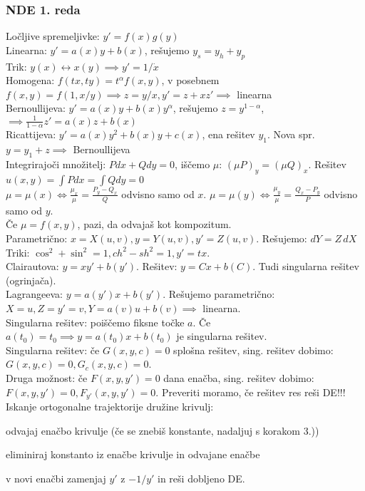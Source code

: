 \documentclass[a4paper,10pt]{article}
\title{\mytitle}
\author{Jure Slak}
\date{\today}
\theoremstyle{definition}
\newenvironment{enumerate*}%
{
\vspace{-6pt}
\begin{enumerate}
\setlength{\itemsep}{0pt}
\setlength{\parskip}{2pt}
}
{\end{enumerate}}
\let\oldint\int
\renewcommand{\int}{\oldint \!}
\begin{document}
\subsubsection*{NDE 1. reda}
Ločljive spremeljivke: $y' = f(x)g(y)$ \\
Linearna: $y' = a(x)y + b(x)$, rešujemo $y_s = y_h + y_p$ \\
Trik: $y(x) \leftrightarrow x(y) \implies y' = 1/\dot{x}$ \\
Homogena: $f(tx, ty) = t^\alpha f(x, y)$, v posebnem $f(x, y) = f(1, x/y)
  \implies z = y/x, y' = z + xz' \implies$ linearna \\
Bernoullijeva: $y' = a(x)y + b(x)y^\alpha$, rešujemo $z = y^{1-\alpha}$,
  $\implies \frac{1}{1-\alpha}z' = a(x)z + b(x)$ \\
Ricattijeva: $y' = a(x)y^2 + b(x)y + c(x)$, ena rešitev $y_1$. Nova spr. $y = y_1 + z
  \implies$ Bernoullijeva \\
Integrirajoči množitelj: $Pdx + Qdy = 0$, iščemo $\mu$: $(\mu P)_y = (\mu Q)_x$.
Rešitev $u(x, y) = \int Pdx = \int Qdy = 0$ \\
\hspace*{20pt} $\mu = \mu(x) \iff \frac{\mu_x}{\mu} = \frac{P_y - Q_x}{Q}$ odvisno samo od $x$.
               $\mu = \mu(y) \iff \frac{\mu_y}{\mu} = \frac{Q_x - P_y}{P}$ odvisno samo od $y$. \\
\hspace*{20pt} Če $\mu = f(x, y)$, pazi, da odvajaš kot kompozitum.\\
Parametrično: $x = X(u, v), y = Y(u, v), y' = Z(u, v)$. Rešujemo: $dY = Z \, dX$ \\
\hspace*{20pt} Triki: $\cos^2 + \sin^2 = 1, ch^2 - sh^2 = 1, y' = tx.$\\
Clairautova: $y = xy' + b(y')$. Rešitev: $y = C x + b(C)$. Tudi singularna
rešitev (ogrinjača). \\
Lagrangeeva: $y = a(y')x + b(y')$. Rešujemo parametrično: $X = u, Z = y' = v, Y =
a(v)u + b(v) \implies$ linearna. \\
\hspace*{20pt} Singularna rešitev: poiščemo fiksne točke $a$. Če $a(t_0) = t_0 \implies y = a(t_0) x + b(t_0)$ je singularna rešitev.\\
Singularna rešitev: če $G(x, y, c) = 0$ splošna rešitev, sing. rešitev dobimo:
$G(x, y, c) = 0, G_c(x, y, c) = 0$. \\
\hspace*{20pt} Druga možnost: če $F(x, y, y') = 0$ dana enačba, sing. rešitev
    dobimo: $F(x, y, y') = 0, F_{y'}(x, y, y') = 0$. Preveriti moramo, če rešitev res reši DE!!! \\
Iskanje ortogonalne trajektorije družine krivulj:
\begin{enumerate*}
  \item odvajaj enačbo krivulje (če se znebiš konstante, nadaljuj s korakom 3.))
  \item eliminiraj konstanto iz enačbe krivulje in odvajane enačbe
  \item v novi enačbi zamenjaj $y'$ z $-1/y'$ in reši dobljeno DE.
\end{enumerate*}
\end{document}
